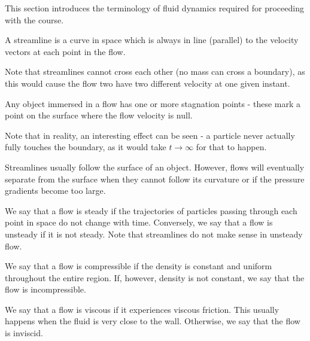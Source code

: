 \documentclass{article}
\begin{document}
This section introduces the terminology of fluid dynamics required for proceeding with the course.

\begin{definition}[Streamline]
    A streamline is a curve in space which is always in line (parallel) to the velocity vectors at each point in the flow.
\end{definition}

Note that streamlines cannot cross each other (no mass can cross a boundary), as this would cause the flow two have two different velocity at one given instant. 

\begin{definition}
    Any object immersed in a flow has one or more stagnation points - these mark a point on the surface where the flow velocity is null.
\end{definition}

Note that in reality, an interesting effect can be seen - a particle never actually fully touches the boundary, as it would take $t \to \infty$ for that to happen.

\begin{definition}
    Streamlines usually follow the surface of an object. However, flows will eventually separate from the surface when they cannot follow its curvature or if the pressure gradients become too large.
\end{definition}

\begin{definition}
    We say that a flow is steady if the trajectories of particles passing through each point in space do not change with time. Conversely, we say that a flow is unsteady if it is not steady. Note that streamlines do not make sense in unsteady flow.
\end{definition}

\begin{definition}
    We say that a flow is compressible if the density is constant and uniform throughout the entire region. If, however, density is not constant, we say that the flow is incompressible.
\end{definition}

\begin{definition}[Viscosity]
    We say that a flow is viscous if it experiences viscous friction. This usually happens when the fluid is very close to the wall. Otherwise, we say that the flow is inviscid.
\end{definition}
\end{document}
